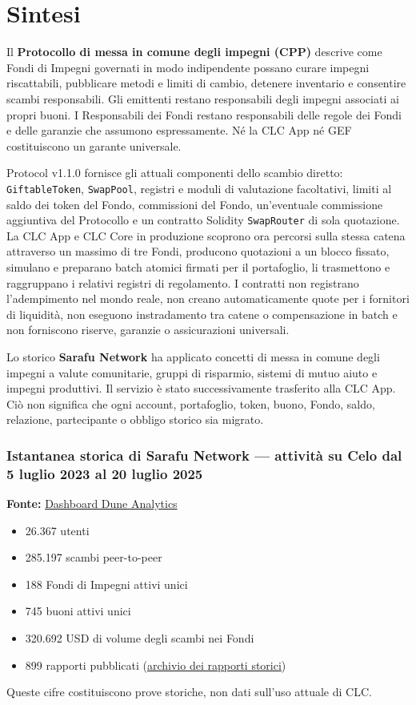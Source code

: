 \documentclass[11pt]{article}
\begin{document}
\section*{Sintesi}

Il \textbf{Protocollo di messa in comune degli impegni (CPP)} descrive come Fondi di Impegni governati in modo indipendente possano curare impegni riscattabili, pubblicare metodi e limiti di cambio, detenere inventario e consentire scambi responsabili. Gli emittenti restano responsabili degli impegni associati ai propri buoni. I Responsabili dei Fondi restano responsabili delle regole dei Fondi e delle garanzie che assumono espressamente. Né la CLC App né GEF costituiscono un garante universale.

Protocol v1.1.0 fornisce gli attuali componenti dello scambio diretto: \texttt{GiftableToken}, \texttt{SwapPool}, registri e moduli di valutazione facoltativi, limiti al saldo dei token del Fondo, commissioni del Fondo, un'eventuale commissione aggiuntiva del Protocollo e un contratto Solidity \texttt{SwapRouter} di sola quotazione. La CLC App e CLC Core in produzione scoprono ora percorsi sulla stessa catena attraverso un massimo di tre Fondi, producono quotazioni a un blocco fissato, simulano e preparano batch atomici firmati per il portafoglio, li trasmettono e raggruppano i relativi registri di regolamento. I contratti non registrano l'adempimento nel mondo reale, non creano automaticamente quote per i fornitori di liquidità, non eseguono instradamento tra catene o compensazione in batch e non forniscono riserve, garanzie o assicurazioni universali.

Lo storico \textbf{Sarafu Network} ha applicato concetti di messa in comune degli impegni a valute comunitarie, gruppi di risparmio, sistemi di mutuo aiuto e impegni produttivi. Il servizio è stato successivamente trasferito alla CLC App. Ciò non significa che ogni account, portafoglio, token, buono, Fondo, saldo, relazione, partecipante o obbligo storico sia migrato.

\subsubsection*{Istantanea storica di Sarafu Network --- attività su Celo dal 5 luglio 2023 al 20 luglio 2025}

\textbf{Fonte:} \href{https://dune.com/grassrootseconomics/sarafu-network}{Dashboard Dune Analytics}

\begin{itemize}[leftmargin=*]
\item 26.367 utenti
\item 285.197 scambi peer-to-peer
\item 188 Fondi di Impegni attivi unici
\item 745 buoni attivi unici
\item 320.692 USD di volume degli scambi nei Fondi
\item 899 rapporti pubblicati (\href{https://sarafu.network/reports}{archivio dei rapporti storici})
\end{itemize}
Queste cifre costituiscono prove storiche, non dati sull'uso attuale di CLC.
\end{document}
